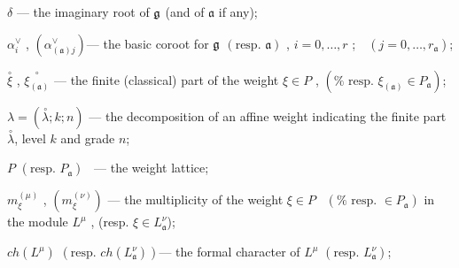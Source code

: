 \documentclass[12pt]{iopart}
\theoremstyle{definition}
\newcommand{\co}[1]{\stackrel{\circ }{#1}}
\newcommand{\af}{\mathfrak{a}}
\begin{document}
$\delta $ --- the imaginary root of $\frak{g}$ (and of $\af$ if any);

$\alpha _{i}^{\vee }$ , $\left( \alpha _{\left( \af\right) j}^{\vee
}\right) $--- the basic coroot for $\frak{g}$ $\left( \mbox{resp. }\af%
\right) $ , $i=0,\ldots ,r$ ;\ \ $\left( j=0,\ldots ,r_{\af}\right) $;

$\co{\xi }$ , $\co{\xi _{\left( \af\right) }}$
--- the finite (classical) part of the weight $\xi \in P$ , $\left( \mbox{%
resp. }\xi _{\left( \af\right) }\in P_{\af}\right) $;

$\lambda =\left( \co{\lambda };k;n\right) $ --- the
decomposition of an affine weight indicating the finite part $\co{\lambda }$, level $k$ and grade $n$;

$P$ $\left( \mbox{resp. } P_{\af}\right) $ \ --- the weight lattice;




$m_{\xi }^{\left( \mu \right) }$ , $\left( m_{\xi }^{\left( \nu \right)
}\right) $ --- the multiplicity of the weight $\xi \in P$ \ $\left( \mbox{%
resp. }\in P_{\af}\right) $ in the module $L^{\mu }$ , (resp. $\xi \in
L_{\af}^{\nu } $);

$ch\left( L^{\mu }\right) $ $\left( \mbox{resp. }ch\left( L_{\af}^{\nu
}\right) \right) $--- the formal character of $L^{\mu }$ $\left( \mbox{resp. }%
L_{\af}^{\nu }\right) $;
\end{document}
